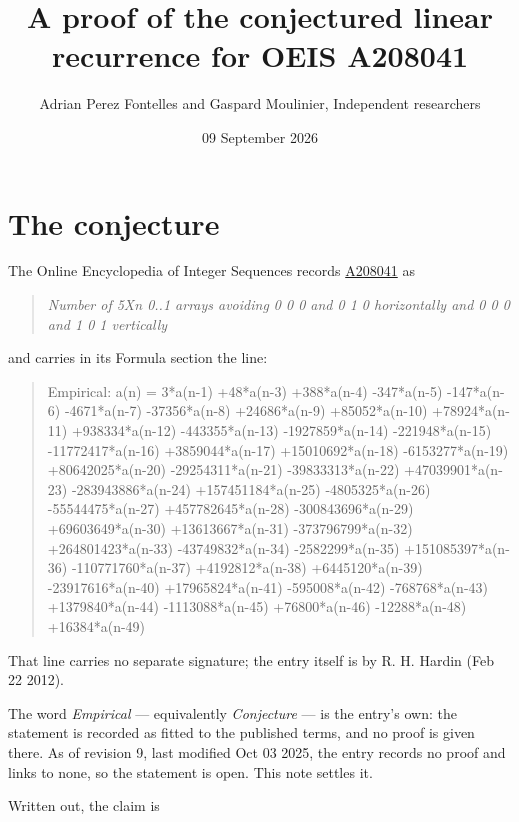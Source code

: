 \documentclass[11pt]{article}
\title{A proof of the conjectured linear recurrence for OEIS A208041}
\author{Adrian Perez Fontelles and Gaspard Moulinier, Independent researchers}
\date{09 September 2026}
\theoremstyle{definition}
\begin{document}
\maketitle
\section{The conjecture}

The Online Encyclopedia of Integer Sequences records \href{https://oeis.org/A208041}{A208041} as

\begin{quote}\itshape Number of 5Xn 0..1 arrays avoiding 0 0 0 and 0 1 0 horizontally and 0 0 0 and 1 0 1 vertically\end{quote}

and carries in its Formula section the line:

\begin{quote}\ttfamily Empirical: a(n) = 3*a(n-1) +48*a(n-3) +388*a(n-4) -347*a(n-5) -147*a(n-6) -4671*a(n-7) -37356*a(n-8) +24686*a(n-9) +85052*a(n-10) +78924*a(n-11) +938334*a(n-12) -443355*a(n-13) -1927859*a(n-14) -221948*a(n-15) -11772417*a(n-16) +3859044*a(n-17) +15010692*a(n-18) -6153277*a(n-19) +80642025*a(n-20) -29254311*a(n-21) -39833313*a(n-22) +47039901*a(n-23) -283943886*a(n-24) +157451184*a(n-25) -4805325*a(n-26) -55544475*a(n-27) +457782645*a(n-28) -300843696*a(n-29) +69603649*a(n-30) +13613667*a(n-31) -373796799*a(n-32) +264801423*a(n-33) -43749832*a(n-34) -2582299*a(n-35) +151085397*a(n-36) -110771760*a(n-37) +4192812*a(n-38) +6445120*a(n-39) -23917616*a(n-40) +17965824*a(n-41) -595008*a(n-42) -768768*a(n-43) +1379840*a(n-44) -1113088*a(n-45) +76800*a(n-46) -12288*a(n-48) +16384*a(n-49)\end{quote}

That line carries no separate signature; the entry itself is by R. H. Hardin (Feb 22 2012).

The word {\itshape Empirical} --- equivalently {\itshape Conjecture} --- is the entry's own: the statement is recorded as fitted to the published terms, and no proof is given there. As of revision 9, last modified Oct 03 2025, the entry records no proof and links to none, so the statement is open. This note settles it.

Written out, the claim is
\end{document}

